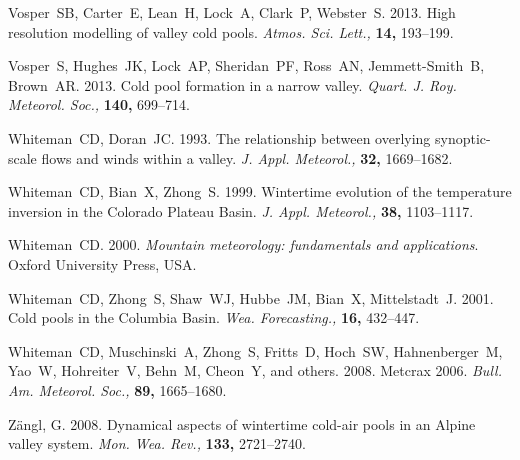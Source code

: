 \documentclass[times]{qjrms4}
\begin{document}
\begin{thebibliography}{99}
Vosper~SB, Carter~E, Lean~H, Lock~A, Clark~P, Webster~S. 2013. High resolution modelling of valley cold pools. \emph{Atmos. Sci. Lett.,} {\bf 14,} 193--199.

Vosper~S, Hughes~JK, Lock~AP, Sheridan~PF, Ross~AN, Jemmett-Smith~B, Brown~AR. 2013. Cold pool formation in a narrow valley. \emph{Quart. J. Roy. Meteorol. Soc.,} {\bf 140,} 699--714.

Whiteman~CD, Doran~JC. 1993. The relationship between overlying synoptic-scale flows and winds within a valley. \emph{J. Appl. Meteorol.,} {\bf 32,} 1669--1682.

Whiteman~CD, Bian~X, Zhong~S. 1999. Wintertime evolution of the temperature inversion in the Colorado Plateau Basin. \emph{J. Appl. Meteorol.,} {\bf 38,} 1103--1117.

Whiteman~CD. 2000. \emph{Mountain meteorology: fundamentals and applications}. Oxford University Press, USA.

Whiteman~CD, Zhong~S, Shaw~WJ, Hubbe~JM, Bian~X, Mittelstadt~J. 2001. Cold pools in the Columbia Basin. \emph{Wea. Forecasting.,} {\bf 16,} 432--447.

Whiteman~CD, Muschinski~A, Zhong~S, Fritts~D, Hoch~SW, Hahnenberger~M, Yao~W, Hohreiter~V, Behn~M, Cheon~Y, and others. 2008. Metcrax 2006. \emph{Bull. Am. Meteorol. Soc.,} {\bf 89,} 1665--1680.

Z{\"a}ngl, G. 2008. Dynamical aspects of wintertime cold-air pools in an Alpine valley system. \emph{Mon. Wea. Rev.,} {\bf 133,} 2721--2740.

\end{thebibliography}
\end{document}
